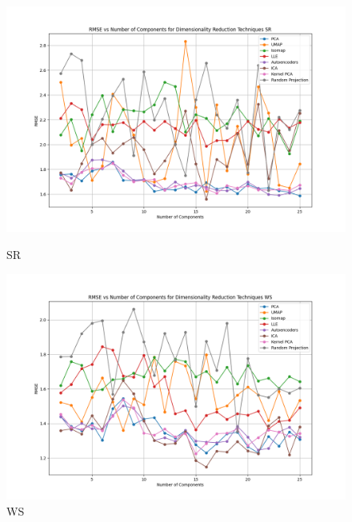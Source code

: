 \begin{figure}[H]
    \centering
    \begin{minipage}{0.45\textwidth}
        \centering
        \includegraphics[width=\linewidth]{reg_section_all/images_dimred_results/dimensionality_reduction_rmse_plot_SR_best.png}
        \caption{SR}
        \label{fig:sr_reg_dimred_training}
    \end{minipage}\hfill
    \begin{minipage}{0.45\textwidth}
        \centering
        \includegraphics[width=\linewidth]{reg_section_all/images_dimred_results/dimensionality_reduction_rmse_plot_WS_best.png}
        \caption{WS}
        \label{fig:ws_reg_dimred_training}
    \end{minipage}
\end{figure}

